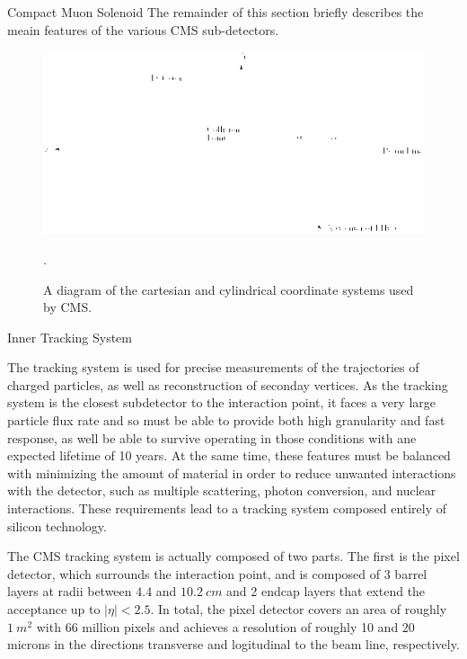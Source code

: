 \begin{section}{Compact Muon Solenoid}
The remainder of this section briefly describes the meain features of the various CMS sub-detectors.

\begin{figure}[tbp!]
\begin{center}
\includegraphics[angle=0,width=0.80\columnwidth]{fig/cms_coordinate_system.png}
\end{center}
\caption{A diagram of the cartesian and cylindrical coordinate systems used by CMS.}.
\label{fig:cms_coordinate_system}
\end{figure}

\begin{subsection}{Inner Tracking System}

The tracking system is used for precise measurements of the trajectories of charged particles, as well as reconstruction of seconday vertices.
As the tracking system is the closest subdetector to the interaction point, it faces a very large particle flux rate and so must be able to provide both high granularity and fast response, as well be able to survive operating in those conditions with ane expected lifetime of 10 years.
At the same time, these features must be balanced with minimizing the amount of material in order to reduce unwanted interactions with the detector, such as multiple scattering, photon conversion, and nuclear interactions.
These requirements lead to a tracking system composed entirely of silicon technology.

The CMS tracking system is actually composed of two parts.
The first is the pixel detector, which surrounds the interaction point, and is composed of 3 barrel layers at radii between $4.4$ and $10.2~cm$ and 2 endcap layers that extend the acceptance up to $|\eta|<2.5$.
In total, the pixel detector covers an area of roughly $1~m^{2}$ with 66 million pixels and achieves a resolution of roughly 10 and 20 microns in the directions transverse and logitudinal to the beam line, respectively.


\end{subsection}
\end{section}
